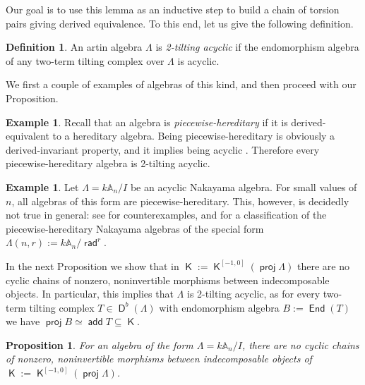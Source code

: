 \documentclass[a4paper,11pt]{amsart}
\theoremstyle{plain}
\newtheorem{prop}[thm]{Proposition}
\theoremstyle{definition}
\newtheorem{dfn}[thm]{Definition}
\newtheorem{ex}[thm]{Example}
\newcommand{\Abb}{\mathbb{A}} \renewcommand{\Bbb}{\mathbb{B}} \newcommand{\Cbb}{\mathbb{C}}
\DeclareMathOperator{\End}{\mathsf{End}}
\DeclareMathOperator{\proj}{\mathsf{proj}}
\DeclareMathOperator{\add}{\mathsf{add}}
\DeclareMathOperator{\rad}{\mathsf{rad}}
\DeclareMathOperator{\D}{\mathsf{D}}
\DeclareMathOperator{\K}{\mathsf{K}}
\begin{document}
Our goal is to use this lemma as an inductive step to build a chain of torsion
pairs giving derived equivalence. To this end,
let us give the following definition.

\begin{dfn}
	An artin algebra $\Lambda$ is \emph{2-tilting acyclic} if the endomorphism
	algebra of any two-term tilting complex over $\Lambda$ is acyclic.
\end{dfn}

We first a couple of examples of algebras of this kind, and then proceed with
our Proposition.


\begin{ex}
	Recall that an algebra is \emph{piecewise-hereditary} if it is
	derived-equivalent to a hereditary algebra. Being piecewise-hereditary is
	obviously a derived-invariant property, and it implies being acyclic
	\cite[Lemma~IV.1.10]{happ-88}. 
	Therefore every piecewise-hereditary algebra is 2-tilting acyclic.
\end{ex}

\begin{ex}
	Let $\Lambda=k\Abb_n/I$ be an acyclic Nakayama algebra.
	For small values of $n$, all algebras of this form are piecewise-hereditary.
	This, however, is decidedly not true in general: see \cite{foss-oppe-stai-24}
	for counterexamples, and \cite[Table~1]{happ-seid-10} for a classification of
	the piecewise-hereditary Nakayama algebras of the special form
	$\Lambda(n,r):=k\Abb_n/\rad^r$.

	In the next Proposition we show that in $\K:=\K^{[-1,0]}(\proj\Lambda)$ there are no
	cyclic chains of nonzero, noninvertible morphisms between indecomposable
	objects. In particular, this implies that $\Lambda$ is 2-tilting acyclic, as
	for every two-term tilting complex $T\in\D^b(\Lambda)$ with endomorphism
	algebra $B:=\End(T)$ we have $\proj B\simeq \add T\subseteq \K$.
\end{ex}

\begin{prop}
	For an algebra of the form $\Lambda=k\Abb_n/I$, there are no cyclic chains of
	nonzero, noninvertible morphisms between indecomposable objects of
	$\K:=\K^{[-1,0]}(\proj\Lambda)$.
\end{prop}
\end{document}
